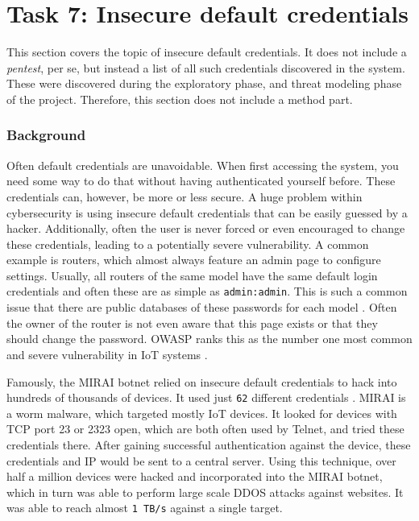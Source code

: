 \section{Task 7: Insecure default credentials}
This section covers the topic of insecure default credentials. It does not include a \textit{pentest}, per se, but instead a list of all such credentials discovered in the system. These were discovered during the exploratory phase, and threat modeling phase of the project. Therefore, this section does not include a method part.

\subsubsection{Background}
Often default credentials are unavoidable. When first accessing the system, you need some way to do that without having authenticated yourself before. These credentials can, however, be more or less secure. A huge problem within cybersecurity is using insecure default credentials that can be easily guessed by a hacker. Additionally, often the user is never forced or even encouraged to change these credentials, leading to a potentially severe vulnerability. A common example is routers, which almost always feature an admin page to configure settings. Usually, all routers of the same model have the same default login credentials and often these are as simple as \texttt{admin:admin}. This is such a common issue that there are public databases of these passwords for each model . Often the owner of the router is not even aware that this page exists or that they should change the password. OWASP ranks this as the number one most common and severe vulnerability in IoT systems \cite{owasp-iot-top10}.

Famously, the MIRAI botnet relied on insecure default credentials to hack into hundreds of thousands of devices. It used just \texttt{62} different credentials \cite{understanding-mirai}. MIRAI is a worm malware, which targeted mostly IoT devices. It looked for devices with TCP port 23 or 2323 open, which are both often used by Telnet, and tried these credentials there. After gaining successful authentication against the device, these credentials and IP would be sent to a central server. Using this technique, over half a million devices were hacked and incorporated into the MIRAI botnet, which in turn was able to perform large scale DDOS attacks against websites. It was able to reach almost \texttt{1 TB/s} against a single target.


